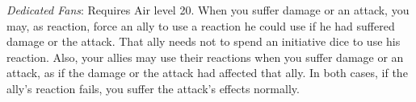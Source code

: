 \textit{Dedicated Fans}: Requires Air level 20. When you suffer damage or an attack, you may, as reaction, force an ally to use a reaction he could use if he had suffered damage or the attack. That ally needs not to spend an initiative dice to use his reaction. Also, your allies may use their reactions when you suffer damage or an attack, as if the damage or the attack had affected that ally. In both cases, if the ally's reaction fails, you suffer the attack's effects normally.




